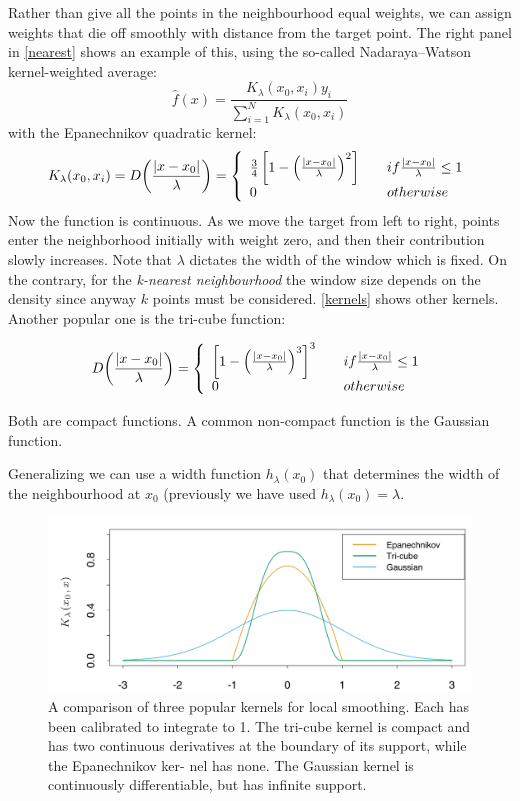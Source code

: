 \documentclass[12pt, letterpaper]{article}
\theoremstyle{definition}
\DeclarePairedDelimiter\autobracket{(}{)}
\newcommand{\br}[1]{\autobracket*{#1}}
\begin{document}
Rather than give all the points in the neighbourhood equal weights, we can assign weights that die off smoothly with distance from the target point. The right panel in \autoref{nearest} shows an example of this, using the so-called Nadaraya–Watson kernel-weighted average:
\begin{equation}
\hat{f}(x) = \frac{K_\lambda(x_0, x_i)y_i}{\sum_{i=1}^N K_\lambda(x_0, x_i)}
\end{equation}
with the Epanechnikov quadratic kernel:
\begin{equation}
K_\lambda(x_0, x_i)= D\br{\frac{|x-x_0|}{\lambda}} = \left\{ \begin{array}{ll}  \frac{3}{4}\left[1-\left(\frac{|x-x_0|}{\lambda} \right)^2 \right]&\quad if \frac{|x-x_0|}{\lambda}\le 1\\
0 &\quad otherwise
\end{array}
 \right.
\end{equation}
Now the function is continuous. As we move the target from left to right, points enter the neighborhood initially with weight zero, and then their contribution slowly increases. Note that $\lambda$ dictates the width of the window which is fixed. On the contrary, for the \textit{k-nearest neighbourhood} the window size depends on the density since anyway $k$ points must be considered. \autoref{kernels} shows other kernels. Another popular one is the tri-cube function:

\begin{equation}
 D\br{\frac{|x-x_0|}{\lambda}} = \left\{ \begin{array}{ll}  \left[1-\left(\frac{|x-x_0|}{\lambda} \right)^3 \right]^3&\quad if \frac{|x-x_0|}{\lambda}\le 1\\
0 &\quad otherwise
\end{array}
 \right.
\end{equation}

Both are compact functions. A common non-compact function is the Gaussian function.

Generalizing we can use a width function $h_\lambda(x_0)$ that determines the width of the neighbourhood at $x_0$ (previously we have used $h_\lambda(x_0) = \lambda$.

\begin{figure}
\centering
\includegraphics[scale=0.4]{img/kernels}
\caption{A comparison of three popular kernels for local smoothing. Each has been calibrated to integrate to 1. The tri-cube kernel is compact and has two continuous derivatives at the boundary of its support, while the Epanechnikov ker- nel has none. The Gaussian kernel is continuously differentiable, but has infinite support.}
\label{kernels}
\end{figure}
\end{document}
